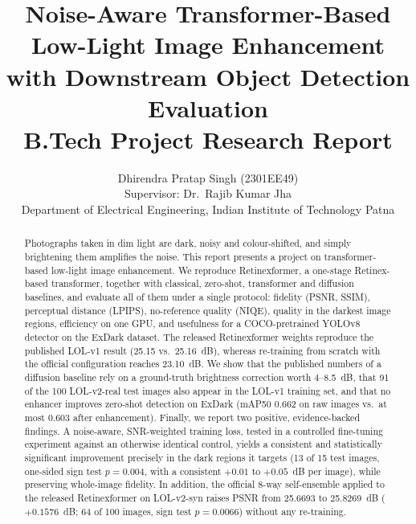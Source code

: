 \documentclass[journal]{IEEEtran}
\begin{document}
\title{Noise-Aware Transformer-Based Low-Light Image Enhancement with Downstream Object Detection Evaluation\\
\large B.Tech Project Research Report}

\author{Dhirendra Pratap Singh (2301EE49)\\
Supervisor: Dr.~Rajib Kumar Jha\\
Department of Electrical Engineering, Indian Institute of Technology Patna}

\maketitle

\begin{abstract}
Photographs taken in dim light are dark, noisy and colour-shifted, and simply brightening them amplifies the noise.
This report presents a project on transformer-based low-light image enhancement. We reproduce
Retinexformer, a one-stage Retinex-based transformer, together with classical, zero-shot, transformer and diffusion
baselines, and evaluate all of them under a single protocol: fidelity (PSNR, SSIM), perceptual distance (LPIPS),
no-reference quality (NIQE), quality in the darkest image regions, efficiency on one GPU, and usefulness for a
COCO-pretrained YOLOv8 detector on the ExDark dataset. The released Retinexformer weights reproduce the published
LOL-v1 result (25.15 vs.\ 25.16~dB), whereas re-training from scratch with the official configuration reaches
23.10~dB. We show that the published numbers of a diffusion baseline rely on a ground-truth brightness correction
worth 4--8.5~dB, that 91 of the 100 LOL-v2-real test images also appear in the LOL-v1 training set, and that no
enhancer improves zero-shot detection on ExDark (mAP50 0.662 on raw images vs.\ at most 0.603 after enhancement).
Finally, we report two positive, evidence-backed findings. A noise-aware, SNR-weighted training loss, tested in a
controlled fine-tuning experiment against an otherwise identical control, yields a consistent and statistically
significant improvement precisely in the dark regions it targets (13 of 15 test images, one-sided sign test
$p=0.004$, with a consistent $+0.01$ to $+0.05$~dB per image), while preserving whole-image fidelity. In addition,
the official 8-way self-ensemble applied to the released Retinexformer on LOL-v2-syn raises PSNR from 25.6693 to
25.8269~dB ($+0.1576$~dB; 64 of 100 images, sign test $p=0.0066$) without any re-training.
\end{abstract}
\end{document}
